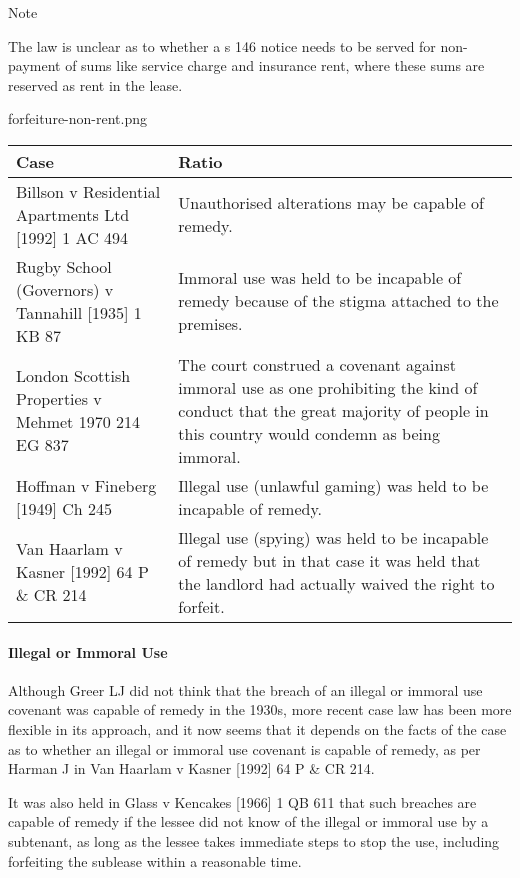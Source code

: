 \documentclass[
]{article}
\newenvironment{env-ab94a4ec-2f9e-4d2f-94d1-74521d1a190e}
{
    \savenotes\tcolorbox[blanker,breakable,left=5pt,borderline west={2pt}{-4pt}{blue}]
}
{
    \endtcolorbox\spewnotes
}
\begin{document}
\begin{env-ab94a4ec-2f9e-4d2f-94d1-74521d1a190e}

Note

The law is unclear as to whether a s 146 notice needs to be served for
non-payment of sums like service charge and insurance rent, where these
sums are reserved as rent in the lease.

\end{env-ab94a4ec-2f9e-4d2f-94d1-74521d1a190e}

forfeiture-non-rent.png

\begin{longtable}[]{@{}ll@{}}
\toprule()
Case & Ratio \\
\midrule()
\endhead
Billson v Residential Apartments Ltd {[}1992{]} 1 AC 494 & Unauthorised
alterations may be capable of remedy. \\
Rugby School (Governors) v Tannahill {[}1935{]} 1 KB 87 & Immoral use
was held to be incapable of remedy because of the stigma attached to the
premises. \\
London Scottish Properties v Mehmet 1970 214 EG 837 & The court
construed a covenant against immoral use as one prohibiting the kind of
conduct that the great majority of people in this country would condemn
as being immoral. \\
Hoffman v Fineberg {[}1949{]} Ch 245 & Illegal use (unlawful gaming) was
held to be incapable of remedy. \\
Van Haarlam v Kasner {[}1992{]} 64 P \& CR 214 & Illegal use (spying)
was held to be incapable of remedy but in that case it was held that the
landlord had actually waived the right to forfeit. \\
\bottomrule()
\end{longtable}

\hypertarget{illegal-or-immoral-use}{%
\paragraph{Illegal or Immoral Use}\label{illegal-or-immoral-use}}

Although Greer LJ did not think that the breach of an illegal or immoral
use covenant was capable of remedy in the 1930s, more recent case law
has been more flexible in its approach, and it now seems that it depends
on the facts of the case as to whether an illegal or immoral use
covenant is capable of remedy, as per Harman J in Van Haarlam v Kasner
{[}1992{]} 64 P \& CR 214.

It was also held in Glass v Kencakes {[}1966{]} 1 QB 611 that such
breaches are capable of remedy if the lessee did not know of the illegal
or immoral use by a subtenant, as long as the lessee takes immediate
steps to stop the use, including forfeiting the sublease within a
reasonable time.
\end{document}
